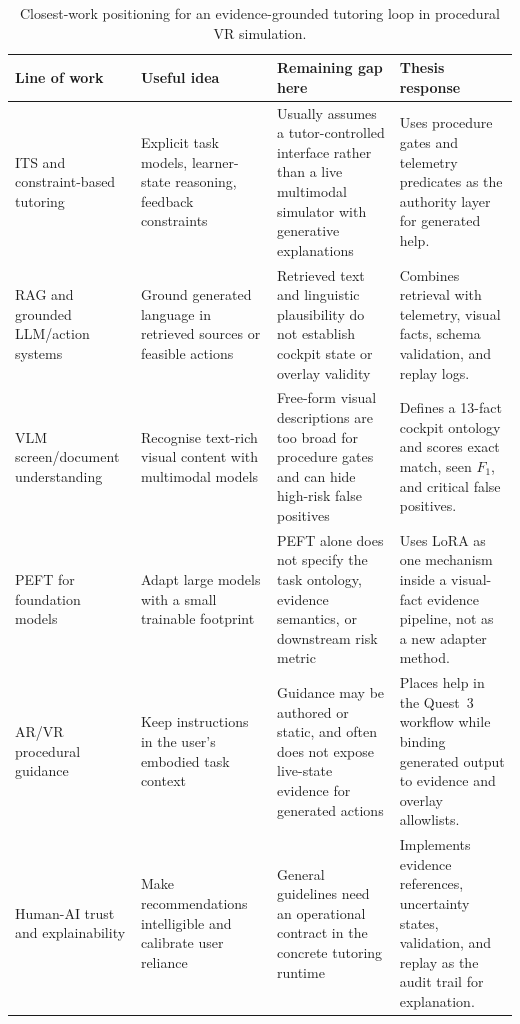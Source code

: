 \begin{table}[htbp]
\centering
\caption{Closest-work positioning for an evidence-grounded tutoring loop in procedural VR simulation.}
\label{tab:closest-work-gap}
\footnotesize
\renewcommand{\arraystretch}{1.08}
\begin{tabularx}{\textwidth}{@{}YYYY@{}}
\toprule
\textbf{Line of work} & \textbf{Useful idea} &
\textbf{Remaining gap here} & \textbf{Thesis response} \\
\midrule
ITS and constraint-based tutoring &
Explicit task models, learner-state reasoning, feedback constraints &
Usually assumes a tutor-controlled interface rather than a live multimodal
simulator with generative explanations &
Uses procedure gates and telemetry predicates as the authority layer for generated help. \\
\addlinespace
RAG and grounded LLM/action systems &
Ground generated language in retrieved sources or feasible actions &
Retrieved text and linguistic plausibility do not establish cockpit state or
overlay validity &
Combines retrieval with telemetry, visual facts, schema validation, and replay logs. \\
\addlinespace
VLM screen/document understanding &
Recognise text-rich visual content with multimodal models &
Free-form visual descriptions are too broad for procedure gates and can hide
high-risk false positives &
Defines a 13-fact cockpit ontology and scores exact match, seen \(F_1\), and critical false positives. \\
\addlinespace
PEFT for foundation models &
Adapt large models with a small trainable footprint &
PEFT alone does not specify the task ontology, evidence semantics, or
downstream risk metric &
Uses LoRA as one mechanism inside a visual-fact evidence pipeline, not as a new adapter method. \\
\addlinespace
AR/VR procedural guidance &
Keep instructions in the user's embodied task context &
Guidance may be authored or static, and often does not expose live-state
evidence for generated actions &
Places help in the Quest~3 workflow while binding generated output to evidence and overlay allowlists. \\
\addlinespace
Human-AI trust and explainability &
Make recommendations intelligible and calibrate user reliance &
General guidelines need an operational contract in the concrete tutoring runtime &
Implements evidence references, uncertainty states, validation, and replay as the audit trail for explanation. \\
\bottomrule
\end{tabularx}
\end{table}

